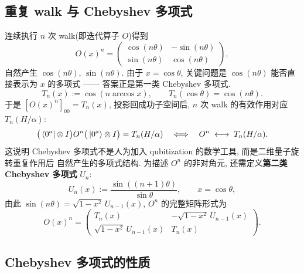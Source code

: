 \documentclass[utf8]{article} %
\numberwithin{equation}{section}   %
\begin{document}
\subsection{重复 walk 与 Chebyshev 多项式}

连续执行 $n$ 次 walk(即迭代算子 $O$)得到
\begin{equation}
    O(x)^n = \begin{pmatrix} \cos(n\theta) & -\sin(n\theta) \\ \sin(n\theta) & \cos(n\theta) \end{pmatrix},
\end{equation}
自然产生 $\cos(n\theta)$, $\sin(n\theta)$. 由于 $x = \cos\theta$, 关键问题是
$\cos(n\theta)$ 能否直接表示为 $x$ 的多项式 —— 答案正是第一类 Chebyshev 多项式.
\begin{equation}
    T_n(x) := \cos(n\arccos x), \qquad T_n(\cos\theta) = \cos(n\theta).
\end{equation}
于是 $[O(x)^n]_{00} = T_n(x)$, 投影回成功子空间后, $n$ 次 walk 的有效作用对应 $T_n(H/\alpha)$:
\begin{equation}
    \big(\bra{0^a}\otimes I\big) O^n \big(\ket{0^a}\otimes I\big) = T_n(H/\alpha)
    \quad\Longleftrightarrow\quad
    O^n \;\longleftrightarrow\; T_n(H/\alpha).
\end{equation}
这说明 Chebyshev 多项式不是人为加入 qubitization 的数学工具, 而是二维量子旋转重复作用后
自然产生的多项式结构. 为描述 $O^n$ 的非对角元, 还需定义\textbf{第二类 Chebyshev 多项式} $U_n$:
\begin{equation}
    U_n(x) := \frac{\sin((n+1)\theta)}{\sin\theta}, \qquad x = \cos\theta,
\end{equation}
由此 $\sin(n\theta) = \sqrt{1-x^2}\,U_{n-1}(x)$, $O^n$ 的完整矩阵形式为
\begin{equation}
    O(x)^n = \begin{pmatrix} T_n(x) & -\sqrt{1-x^2}\,U_{n-1}(x) \\
        \sqrt{1-x^2}\,U_{n-1}(x) & T_n(x) \end{pmatrix}.
\end{equation}

\subsection{Chebyshev 多项式的性质}
\end{document}
